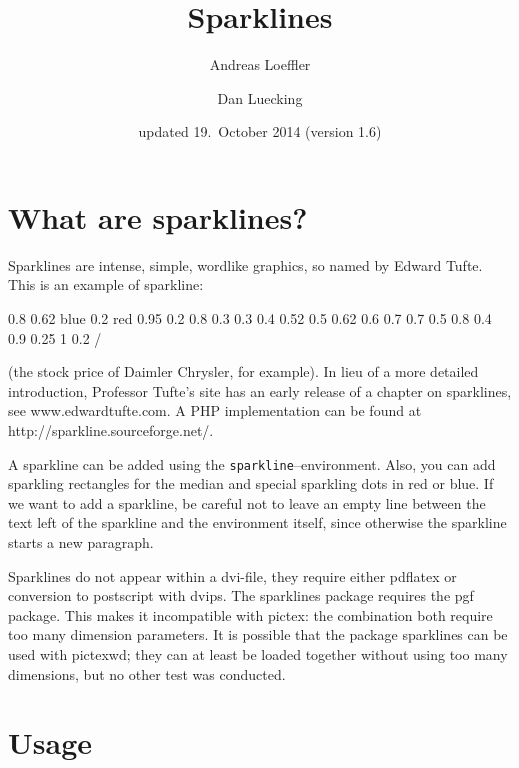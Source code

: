 \documentclass{article}
\let\env=\texttt
\let\pkg=\textsf
\begin{document}
\title{Sparklines}
\author{Andreas Loeffler \and Dan Luecking}
\date{updated 19.~October 2014  (version 1.6)}\maketitle

\section{What are sparklines?}

Sparklines are intense, simple, wordlike graphics, so named by Edward
Tufte. This is an example of sparkline:
\begin{sparkline}{10}
%
 0.8
%
 0.62 blue
%
 0.2 red
%
 0.95  0.2 0.8  0.3 0.3  0.4 0.52  0.5 0.62
       0.6 0.7   0.7 0.5  0.8 0.4  0.9 0.25  1 0.2 /
\end{sparkline}
(the stock price of Daimler Chrysler, for example).
%
In lieu of a more detailed introduction, Professor Tufte's site
has an early release of a chapter on sparklines, see
www.edwardtufte.com. A PHP implementation can be found at
http://sparkline.sourceforge.net/.

A sparkline can be added using the \env{sparkline}--environment.
Also, you can add sparkling rectangles for the median and special
sparkling dots in red or blue. If we want to add a sparkline, be careful not to leave an empty line
between the text left of the sparkline and the environment itself,
since otherwise the sparkline starts a new paragraph.

Sparklines do not appear within a
dvi-file, they require either pdflatex or conversion to postscript with
dvips. The \textsf{sparklines} package requires the \pkg{pgf} package.
This makes it incompatible with \pkg{pictex}: the combination both
require too many dimension parameters. It is possible that the package \pkg{sparklines}
can be used with \pkg{pictexwd}; they can at least be loaded together
without using too many dimensions, but no other test was conducted.


\section{Usage}
\end{document}
